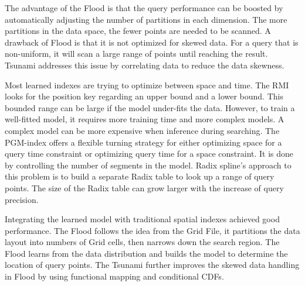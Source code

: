 The advantage\cite{Ding:2020we} of the Flood is that the query performance can be boosted by automatically adjusting the number of partitions in each dimension. The more partitions in the data space, the fewer points are needed to be scanned. A drawback of Flood is that it is not optimized for skewed data. For a query that is non-uniform, it will scan a large range of points until reaching the result. Tsunami addresses this issue by correlating data to reduce the data skewness. 

Most learned indexes are trying to optimize between space and time. The RMI looks for the position key regarding an upper bound and a lower bound. This bounded range can be large if the model under-fits the data. However, to train a well-fitted model, it requires more training time and more complex models. A complex model can be more expensive when inference during searching.  The PGM-index offers a flexible turning strategy for either optimizing space for a query time constraint or optimizing query time for a space constraint. It is done by controlling the number of segments in the model. Radix spline’s approach to this problem is to build a separate Radix table to look up a range of query points. The size of the Radix table can grow larger with the increase of query precision. 

Integrating the learned model with traditional spatial indexes achieved good performance. The Flood follows the idea from the Grid File, it partitions the data layout into numbers of Grid cells, then narrows down the search region. The Flood learns from the data distribution and builds the model to determine the location of query points. The Tsunami further improves the skewed data handling in Flood by using functional mapping and conditional CDFs. 
